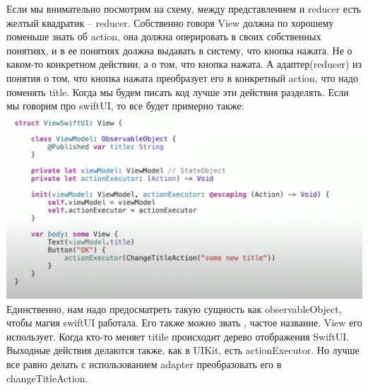 \documentclass{article}
\begin{document}
    \newline
    Если мы внимательно посмотрим на схему, между представлением и reducer есть желтый квадратик -- reducer. Собственно говоря View должна по хорошему поменьше знать об action, она должна оперировать в своих собственных понятиях, и в ее понятиях должна выдавать в систему, что кнопка нажата. Не о каком-то конкретном действии, а о том, что кнопка нажата. А адаптер(reducer) из понятия о том, что кнопка нажата преобразует его в конкретный action, что надо поменять title. Когда мы будем писать код лучше эти действия разделять. 
    \newline
    Если мы говорим про swiftUI, то все будет примерно также: 
    \newline
    \includegraphics[scale = 0.3]{pic/Снимок экрана 2023-07-30 в 22.03.34.png}
    \newline
    Единственно, нам надо предосматреть такую сущность как observableObject, чтобы магия swiftUI работала. Его также можно звать , частое название. View его использует. Когда кто-то меняет titile происходит дерево отображения SwiftUI. Выходные действия делаются также, как в UIKit, есть actionExecutor. Но лучше все равно делать с использованием adapter преобразовать его в changeTitleAction.
\end{document}

